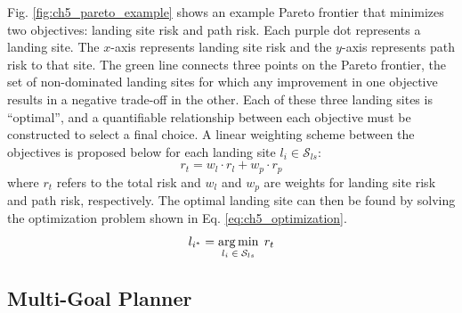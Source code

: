 Fig. \ref{fig:ch5_pareto_example} shows an example Pareto frontier that minimizes two objectives: landing site risk and path risk.  Each purple dot represents a landing site. The $x$-axis represents landing site risk and the $y$-axis represents path risk to that site. 
The green line connects three points on the Pareto frontier, the set of non-dominated landing sites for which any improvement in one objective results in a negative trade-off in the other. Each of these three landing sites is ``optimal'', and a quantifiable relationship between each objective must be constructed to select a final choice. A linear weighting scheme between the objectives is proposed below for each landing site $l_i \in \mathcal{S}_{ls} $:
\begin{equation}\label{eq:ch5_total_risk}
    r_{t} = w_l \cdot r_{l} + w_p \cdot r_{p}
\end{equation}
where $r_{t}$ refers to the total risk and $w_l$ and $w_p$ are weights for landing site risk and path risk, respectively. The optimal landing site can then be found by solving the optimization problem shown in Eq. \ref{eq:ch5_optimization}.
\begin{equation}
    l_{i^*} = \operatorname*{arg\,min}_{l_i \; \in \; \mathcal{S}_{ls}} \; r_{t}\label{eq:ch5_optimization}
\end{equation}

\subsection{Multi-Goal Planner}\label{sec:ch5_multi_goal_search_all}

